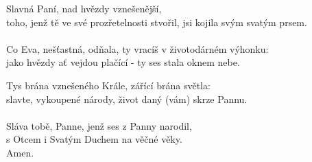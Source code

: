 \begin{translatioMulticol}{2}
Slavná Paní, nad hvězdy vznešenější,\\
toho, jenž tě ve své prozřetelnosti stvořil, jsi kojila svým svatým prsem.\\
\\
Co Eva, nešťastná, odňala, ty vracíš v životodárném výhonku:\\
jako hvězdy ať vejdou plačící - ty ses stala oknem nebe.\columnbreak

Tys brána vznešeného Krále, zářící brána světla:\\
slavte, vykoupené národy, život daný (vám) skrze Pannu.\\
\\
Sláva tobě, Panne, jenž ses z Panny narodil,\\
s Otcem i Svatým Duchem na věčné věky.\\
Amen.
\end{translatioMulticol}
